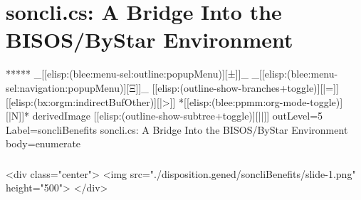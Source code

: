\section{soncli.cs: A Bridge Into the BISOS/ByStar Environment}


\begin{whenOrg}
*****  _[[elisp:(blee:menu-sel:outline:popupMenu)][±]]_ _[[elisp:(blee:menu-sel:navigation:popupMenu)][Ξ]]_ [[elisp:(outline-show-branches+toggle)][|=]] [[elisp:(bx:orgm:indirectBufOther)][|>]] *[[elisp:(blee:ppmm:org-mode-toggle)][|N]]*  derivedImage [[elisp:(outline-show-subtree+toggle)][||]] outLevel=5 Label=soncliBenefits soncli.cs: A Bridge Into the BISOS/ByStar Environment body=enumerate
\end{whenOrg}

\begin{htmlonly}

\begin{frame}[fragile,plain,label=soncliBenefits]
    \frametitle{}
    \framesubtitle{}
    \begin{rawhtml}
<div class="center">
<img src="./disposition.gened/soncliBenefits/slide-1.png" height="500">
</div>
    \end{rawhtml}
\end{frame}
\end{htmlonly}

